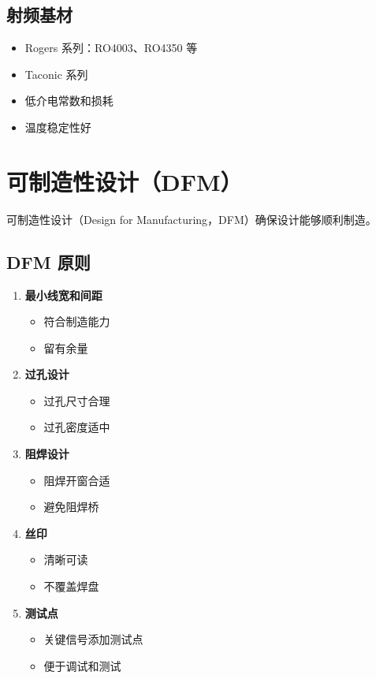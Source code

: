 \subsection{射频基材}

\begin{itemize}
  \item Rogers 系列：RO4003、RO4350 等
  \item Taconic 系列
  \item 低介电常数和损耗
  \item 温度稳定性好
\end{itemize}

\section{可制造性设计（DFM）}

可制造性设计（Design for Manufacturing，DFM）确保设计能够顺利制造。

\subsection{DFM 原则}

\begin{enumerate}
  \item \textbf{最小线宽和间距}
    \begin{itemize}
      \item 符合制造能力
      \item 留有余量
    \end{itemize}

  \item \textbf{过孔设计}
    \begin{itemize}
      \item 过孔尺寸合理
      \item 过孔密度适中
    \end{itemize}

  \item \textbf{阻焊设计}
    \begin{itemize}
      \item 阻焊开窗合适
      \item 避免阻焊桥
    \end{itemize}

  \item \textbf{丝印}
    \begin{itemize}
      \item 清晰可读
      \item 不覆盖焊盘
    \end{itemize}

  \item \textbf{测试点}
    \begin{itemize}
      \item 关键信号添加测试点
      \item 便于调试和测试
    \end{itemize}
\end{enumerate}

